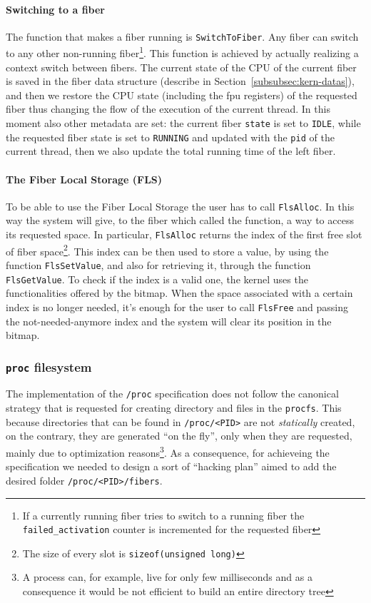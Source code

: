 \documentclass[a4paper,10pt]{article}
\begin{document}
\paragraph{Switching to a fiber}
The function that makes a fiber running is \lstinline{SwitchToFiber}. Any fiber can switch to any other non-running fiber\footnote{If a currently running fiber tries to switch to a running fiber the \lstinline{failed_activation} counter is incremented for the requested fiber}. This function is achieved by actually realizing a context switch between fibers. The current state of the CPU of the current fiber is saved in the fiber data structure (describe in Section~\ref{subsubsec:kern-datas}), and then we restore the CPU state (including the fpu registers) of the requested fiber thus changing the flow of the execution of the current thread. In this moment also other metadata are set: the current fiber \lstinline{state} is set to \texttt{IDLE}, while the requested fiber state is set to \texttt{RUNNING} and updated with the \texttt{pid} of the current thread, then we also update the total running time of the left fiber.

\paragraph{The Fiber Local Storage (FLS)}
To be able to use the Fiber Local Storage the user has to call \lstinline{FlsAlloc}. In this way the system will give, to the fiber which called the function, a way to access its requested space. In particular, \lstinline{FlsAlloc} returns the index of the first free slot of fiber space\footnote{The size of every slot is \lstinline{sizeof(unsigned long)}}. This index can be then used to store a value, by using the function \lstinline{FlsSetValue}, and also for retrieving it, through the function \lstinline{FlsGetValue}. To check if the index is a valid one, the kernel uses the functionalities offered by the bitmap. When the space associated with a certain index is no longer needed, it’s enough for the user to call \lstinline{FlsFree} and passing the not-needed-anymore index and the system will clear its position in the bitmap.

\subsubsection{\texttt{\/proc} filesystem}\label{subsubsec:kern-procfs}
The implementation of the \texttt{/proc} specification does not follow the canonical strategy that is requested for creating directory and files in the \texttt{procfs}. This because directories that can be found in \lstinline{/proc/<PID>} are not \textit{statically} created, on the contrary, they are generated ``on the fly'', only when they are requested, mainly due to optimization reasons\footnote{A process can, for example, live for only few milliseconds and as a consequence it would be not efficient to build an entire directory tree}. As a consequence, for achieveing the specification we needed to design a sort of ``hacking plan'' aimed to add the desired folder \lstinline{/proc/<PID>/fibers}.
\end{document}
